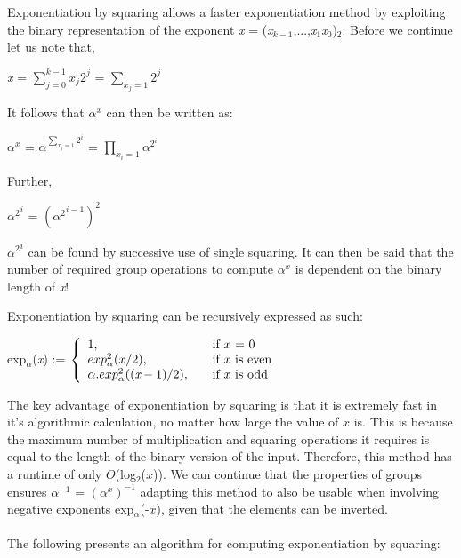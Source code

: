 \documentclass[iwp,first]{luthesis}
\begin{document}
Exponentiation by squaring allows a faster exponentiation method by exploiting the binary representation of the exponent \textit{x} = (\textit{x}$_{k-1}$,...,\textit{x}$_1$\textit{x}$_0$)$_2$. Before we continue let us note that,

\begin{center}
\textit{x} = $\displaystyle\sum\limits_{j=0}^{k-1} x_{j}2^j$ = $\displaystyle\sum\limits_{x_{j}=1} 2^j$
\end{center}

It follows that \textit{$\alpha$}$^x$ can then be written as:

\begin{center}
\textit{$\alpha$}$^x$ = \textit{$\alpha$}$^{\displaystyle\sum\nolimits_{x_i = 1} 2^i}$ = $\displaystyle\prod\limits_{x_i = 1} \textit{$\alpha$}^{2^i}$
\end{center}

Further,

\begin{center}
${\textit{$\alpha$}^{2}}^{i}$ = ${({\textit{$\alpha$}^{2}}^{i-1})}^2$
\end{center}

${\textit{$\alpha$}^{2}}^{i}$ can be found by successive use of single squaring. It can then be said that the number of required group operations to compute \textit{$\alpha$}$^x$ is dependent on the binary length of \textit{x}!

Exponentiation by squaring can be recursively expressed as such:

\begin{center}
exp$_\alpha$(\textit{x}) := $\left\{
\begin{array}{l l l}
	1, & \quad \textrm{if $x$ = 0}\\
	exp_{\alpha}^2(x/2), & \quad \textrm{if $x$ is even}\\
	\textit{$\alpha$}.exp_{\alpha}^2((\textit{x}-1)/2), & \quad \textrm{if $x$ is odd}\\
\end{array} \right.$
\end{center}

The key advantage of exponentiation by squaring is that it is extremely fast in it's algorithmic calculation, no matter how large the value of $x$ is. This is because the maximum number of multiplication and squaring operations it requires is equal to the length of the binary version of the input. Therefore, this method has a runtime of only $O$(log$_2$($x$)). We can continue that the properties of groups ensures $\alpha^{-1}$ = ${(\alpha^x)}^{-1}$ adapting this method to also be usable when involving negative exponents exp$_\alpha$(-$x$), given that the elements can be inverted. 
\\
\\
The following presents an algorithm for computing exponentiation by squaring:
\end{document}
